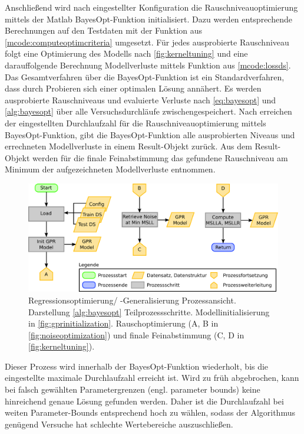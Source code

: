 Anschließend wird nach eingestellter Konfiguration die Rauschniveauoptimierung mittels der Matlab BayesOpt-Funktion initialisiert. Dazu werden entsprechende Berechnungen auf den Testdaten mit der Funktion aus \autoref{mcode:computeoptimcriteria} umgesetzt. Für jedes ausprobierte Rauschniveau folgt eine Optimierung des Modells nach \autoref{fig:kerneltuning} und eine darauffolgende Berechnung Modellverluste mittels Funktion aus \autoref{mcode:lossds}. Das Gesamtverfahren über die BayesOpt-Funktion ist ein Standardverfahren, dass durch Probieren sich einer optimalen Lösung annähert. Es werden ausprobierte Rauschniveaus und evaluierte Verluste nach \autoref{eq:bayesopt} und \autoref{alg:bayesopt} über alle Versuchsdurchläufe zwischengespeichert. Nach erreichen der eingestellten Durchlaufzahl für die Rauschniveauoptimierung mittels BayesOpt-Funktion, gibt die BayesOpt-Funktion alle ausprobierten Niveaus und errechneten Modellverluste in einem Result-Objekt zurück. Aus dem Result-Objekt werden für die finale Feinabstimmung das gefundene Rauschniveau am Minimum der aufgezeichneten Modellverluste entnommen.


\vspace{5mm}
\begin{figure}[tbph]
	\centering
	\includegraphics[width=\linewidth]{chapters/images/3-SW-E-OExp/GPR_Optimization}
	\caption[Regressionsoptimierung/ -Generalisierung Prozessansicht]{Regressionsoptimierung/ -Generalisierung Prozessansicht. Darstellung \autoref{alg:bayesopt} Teilprozessschritte. Modellinitialisierung in \autoref{fig:gprinitialization}. Rauschoptimierung (A, B in \autoref{fig:noiseoptimization}) und finale Feinabstimmung (C, D in \autoref{fig:kerneltuning}).}
	\label{fig:gproptimization}
\end{figure}


\clearpage


Dieser Prozess wird innerhalb der BayesOpt-Funktion wiederholt, bis die eingestellte maximale Durchlaufzahl erreicht ist. Wird zu früh abgebrochen, kann bei falsch gewählten Parametergrenzen (engl. parameter bounds) keine hinreichend genaue Lösung gefunden werden. Daher ist die Durchlaufzahl bei weiten Parameter-Bounds entsprechend hoch zu wählen, sodass der Algorithmus genügend Versuche hat schlechte Wertebereiche auszuschließen.


